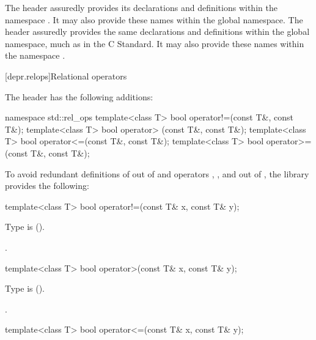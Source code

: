 \pnum
\begin{example}
The header
%
%
 assuredly
provides its declarations and definitions within the namespace
. It may also provide these names within the
global namespace.
The header
assuredly provides the same declarations and definitions within
the global namespace,
much as in the C Standard. It may also provide these names within
the namespace .
\end{example}

[depr.relops]{Relational operators}

\pnum
The header 
%
has the following additions:

\begin{codeblock}
namespace std::rel_ops {
  template<class T> bool operator!=(const T&, const T&);
  template<class T> bool operator> (const T&, const T&);
  template<class T> bool operator<=(const T&, const T&);
  template<class T> bool operator>=(const T&, const T&);
}
\end{codeblock}

\pnum
To avoid redundant definitions of  out of 
and operators \tcode{>}, \tcode{<=}, and \tcode{>=} out of ,
the library provides the following:

%
\begin{itemdecl}
template<class T> bool operator!=(const T& x, const T& y);
\end{itemdecl}

\begin{itemdescr}
\pnum
\requires
Type  is  ().

\pnum
\returns
{}.
\end{itemdescr}

%
\begin{itemdecl}
template<class T> bool operator>(const T& x, const T& y);
\end{itemdecl}

\begin{itemdescr}
\pnum
\requires
Type  is  ().

\pnum
\returns
{}.
\end{itemdescr}

%
\begin{itemdecl}
template<class T> bool operator<=(const T& x, const T& y);
\end{itemdecl}

